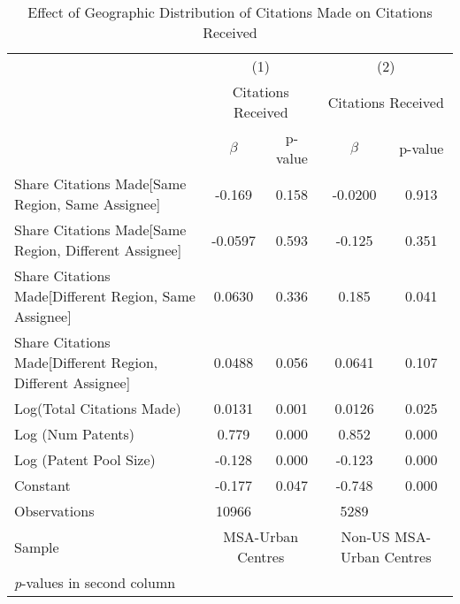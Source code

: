 {
\begin{longtable}{l*{2}{cc}}
\caption{Effect of Geographic Distribution of Citations Made on Citations Received \label{model12}}\\
\hline\hline\endfirsthead\hline\endhead\hline\endfoot\endlastfoot
                &\multicolumn{2}{c}{(1)}&\multicolumn{2}{c}{(2)}\\
                &\multicolumn{2}{c}{Citations Received}&\multicolumn{2}{c}{Citations Received}\\
                &$\beta$&p-value&$\beta$&p-value\\
\hline
Share Citations Made[Same Region, Same Assignee]&   -0.169&    0.158&  -0.0200&    0.913\\
Share Citations Made[Same Region, Different Assignee]&  -0.0597&    0.593&   -0.125&    0.351\\
Share Citations Made[Different Region, Same Assignee]&   0.0630&    0.336&    0.185&    0.041\\
Share Citations Made[Different Region, Different Assignee]&   0.0488&    0.056&   0.0641&    0.107\\
Log(Total Citations Made)&   0.0131&    0.001&   0.0126&    0.025\\
Log (Num Patents)&    0.779&    0.000&    0.852&    0.000\\
Log (Patent Pool Size)&   -0.128&    0.000&   -0.123&    0.000\\
Constant        &   -0.177&    0.047&   -0.748&    0.000\\
\hline
Observations    &    10966&         &     5289&         \\
Sample          &\multicolumn{2}{c}{MSA-Urban Centres}&\multicolumn{2}{c}{Non-US MSA-Urban Centres}         \\
\hline\hline
\multicolumn{5}{l}{\footnotesize \textit{p}-values in second column}\\
\end{longtable}
}
